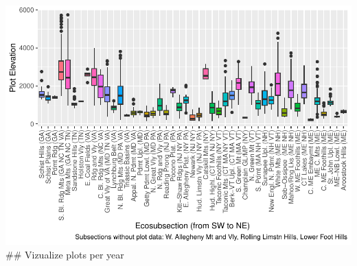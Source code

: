 \documentclass[
]{book}
\begin{document}
\includegraphics{_main_files/figure-latex/viz-plot-attributes-final-1.pdf}
\#\# Vizualize plots per year
\end{document}
